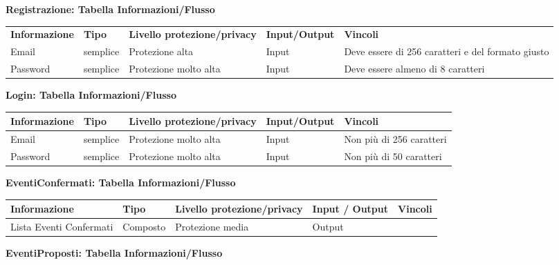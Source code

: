 \hfill \break

\textbf{Registrazione: Tabella Informazioni/Flusso}
\hfill \break

\begin{tabular} {|P{3cm}|P{3cm}|P{3cm}|P{3cm}|P{3cm}|}
    \hline
    \textbf{Informazione} & \textbf{Tipo} & \textbf{Livello protezione/privacy} & \textbf{Input/Output} & \textbf{Vincoli}                                  \\
    Email                 & semplice      & Protezione alta                     & Input                 & Deve essere di 256 caratteri e del formato giusto \\
    \hline
    Password              & semplice      & Protezione molto alta               & Input                 & Deve essere almeno di 8 caratteri                 \\
    \hline
\end{tabular}
\hfill \break

\textbf{Login: Tabella Informazioni/Flusso}
\hfill \break

\begin{tabular} {|P{3cm}|P{3cm}|P{3cm}|P{3cm}|P{3cm}|}
    \hline
    \textbf{Informazione} & \textbf{Tipo} & \textbf{Livello protezione/privacy} & \textbf{Input/Output} & \textbf{Vincoli}         \\
    \hline
    Email                 & semplice      & Protezione molto alta               & Input                 & Non più di 256 caratteri \\
    \hline
    Password              & semplice      & Protezione molto alta               & Input                 & Non più di 50 caratteri  \\
    \hline
\end{tabular}
\hfill \break

\textbf{EventiConfermati: Tabella Informazioni/Flusso}
\hfill \break

\begin{tabular} {|P{3cm}|P{3cm}|P{3cm}|P{3cm}|P{3cm}|}
    \hline
    \textbf{Informazione}   & \textbf{Tipo} & \textbf{Livello protezione/privacy} & \textbf{Input / Output} & \textbf{Vincoli} \\
    \hline
    Lista Eventi Confermati & Composto      & Protezione media                    & Output                  &                  \\
    \hline
\end{tabular}
\hfill \break

\textbf{EventiProposti: Tabella Informazioni/Flusso}
\hfill \break

